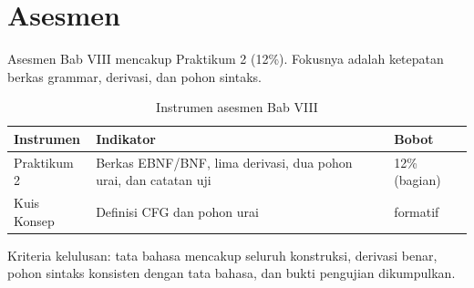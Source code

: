 \section*{Asesmen}

Asesmen Bab VIII mencakup Praktikum 2 (12\%). Fokusnya adalah
ketepatan berkas grammar, derivasi, dan pohon sintaks.

\begin{table}[H]
\centering
\caption{Instrumen asesmen Bab VIII}
\label{tab:ch08-asesmen}
\begin{tabularx}{\textwidth}{@{}lXl@{}}
\toprule
\textbf{Instrumen} & \textbf{Indikator} & \textbf{Bobot} \\
\midrule
Praktikum 2 & Berkas EBNF/BNF, lima derivasi, dua pohon urai, dan
catatan uji & 12\% (bagian) \\
Kuis Konsep & Definisi CFG dan pohon urai & formatif \\
\bottomrule
\end{tabularx}
\end{table}

Kriteria kelulusan: tata bahasa mencakup seluruh konstruksi,
derivasi benar, pohon sintaks konsisten dengan tata bahasa, dan bukti
pengujian dikumpulkan.
